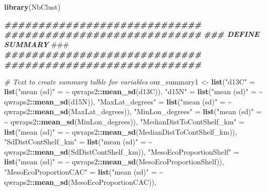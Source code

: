 \documentclass[
]{article}
\newenvironment{Shaded}{\begin{snugshade}}{\end{snugshade}}
\newcommand{\AlertTok}[1]{\textcolor[rgb]{0.94,0.16,0.16}{#1}}
\newcommand{\CommentTok}[1]{\textcolor[rgb]{0.56,0.35,0.01}{\textit{#1}}}
\newcommand{\DocumentationTok}[1]{\textcolor[rgb]{0.56,0.35,0.01}{\textbf{\textit{#1}}}}
\newcommand{\ErrorTok}[1]{\textcolor[rgb]{0.64,0.00,0.00}{\textbf{#1}}}
\newcommand{\FunctionTok}[1]{\textcolor[rgb]{0.13,0.29,0.53}{\textbf{#1}}}
\newcommand{\NormalTok}[1]{#1}
\newcommand{\OtherTok}[1]{\textcolor[rgb]{0.56,0.35,0.01}{#1}}
\newcommand{\SpecialCharTok}[1]{\textcolor[rgb]{0.81,0.36,0.00}{\textbf{#1}}}
\newcommand{\StringTok}[1]{\textcolor[rgb]{0.31,0.60,0.02}{#1}}
\begin{document}
\begin{Shaded}
\begin{Highlighting}[]
\FunctionTok{library}\NormalTok{(NbClust)}

\DocumentationTok{\#\#\#\#\#\#\#\#\#\#\#\#\#\#\#\#\#\#\#\#\#\#\#\#\#\#\#\#\#}
\DocumentationTok{\#\#\#\#\#\#\#\#\#\#\#\#\#\#\#\#\#\#\#\#\#\#\#\#\#\#\#\#\#}
\DocumentationTok{\#\#\#    DEFINE SUMMARY     }\AlertTok{\#\#\#}
\DocumentationTok{\#\#\#\#\#\#\#\#\#\#\#\#\#\#\#\#\#\#\#\#\#\#\#\#\#\#\#\#\#}
\DocumentationTok{\#\#\#\#\#\#\#\#\#\#\#\#\#\#\#\#\#\#\#\#\#\#\#\#\#\#\#\#\#}

\CommentTok{\# Text to create summary talble for variables}
\NormalTok{our\_summary1 }\OtherTok{\textless{}{-}}
  \FunctionTok{list}\NormalTok{(}\StringTok{"d13C"} \OtherTok{=} \FunctionTok{list}\NormalTok{(}\StringTok{"mean (sd)"} \OtherTok{=} \ErrorTok{\textasciitilde{}}\NormalTok{ qwraps2}\SpecialCharTok{::}\FunctionTok{mean\_sd}\NormalTok{(d13C)),}
       \StringTok{"d15N"} \OtherTok{=} \FunctionTok{list}\NormalTok{(}\StringTok{"mean (sd)"} \OtherTok{=} \ErrorTok{\textasciitilde{}}\NormalTok{ qwraps2}\SpecialCharTok{::}\FunctionTok{mean\_sd}\NormalTok{(d15N)),}
       \StringTok{"MaxLat\_degrees"} \OtherTok{=} \FunctionTok{list}\NormalTok{(}\StringTok{"mean (sd)"} \OtherTok{=} \ErrorTok{\textasciitilde{}}\NormalTok{ qwraps2}\SpecialCharTok{::}\FunctionTok{mean\_sd}\NormalTok{(MaxLat\_degrees)),}
       \StringTok{"MinLon\_degrees"} \OtherTok{=} \FunctionTok{list}\NormalTok{(}\StringTok{"mean (sd)"} \OtherTok{=} \ErrorTok{\textasciitilde{}}\NormalTok{ qwraps2}\SpecialCharTok{::}\FunctionTok{mean\_sd}\NormalTok{(MinLon\_degrees)),}
       \StringTok{"MedianDistToContShelf\_km"} \OtherTok{=} \FunctionTok{list}\NormalTok{(}\StringTok{"mean (sd)"} \OtherTok{=} \ErrorTok{\textasciitilde{}}\NormalTok{ qwraps2}\SpecialCharTok{::}\FunctionTok{mean\_sd}\NormalTok{(MedianDistToContShelf\_km)),}
       \StringTok{"SdDistContShelf\_km"} \OtherTok{=} \FunctionTok{list}\NormalTok{(}\StringTok{"mean (sd)"} \OtherTok{=} \ErrorTok{\textasciitilde{}}\NormalTok{ qwraps2}\SpecialCharTok{::}\FunctionTok{mean\_sd}\NormalTok{(SdDistContShelf\_km)),}
       \StringTok{"MesoEcoProportionShelf"} \OtherTok{=} \FunctionTok{list}\NormalTok{(}\StringTok{"mean (sd)"} \OtherTok{=} \ErrorTok{\textasciitilde{}}\NormalTok{ qwraps2}\SpecialCharTok{::}\FunctionTok{mean\_sd}\NormalTok{(MesoEcoProportionShelf)),}
       \StringTok{"MesoEcoProportionCAC"} \OtherTok{=} \FunctionTok{list}\NormalTok{(}\StringTok{"mean (sd)"} \OtherTok{=} \ErrorTok{\textasciitilde{}}\NormalTok{ qwraps2}\SpecialCharTok{::}\FunctionTok{mean\_sd}\NormalTok{(MesoEcoProportionCAC)),}

\end{Highlighting}
\end{Shaded}
\end{document}
